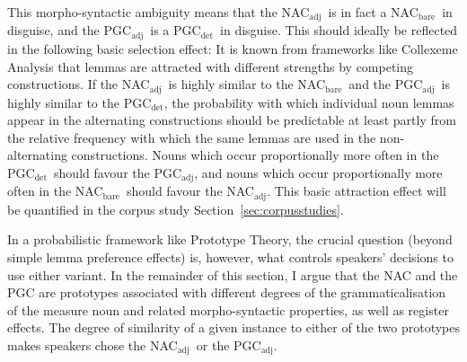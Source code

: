 \documentclass[USenglish]{article}
\newcommand{\Sub}[1]{\ensuremath{\mathrm{_{#1}}}}
\newcommand{\NACb}{NAC\Sub{bare}}
\newcommand{\NACa}{NAC\Sub{adj}}
\newcommand{\PGCd}{PGC\Sub{det}}
\newcommand{\PGCa}{PGC\Sub{adj}}
\begin{document}
This morpho-syntactic ambiguity means that the \NACa\ is in fact a \NACb\ in disguise, and the \PGCa\ is a \PGCd\ in disguise.
This should ideally be reflected in the following basic selection effect:
It is known from frameworks like Collexeme Analysis \citep{GriesStefanowitsch2004} that lemmas are attracted with different strengths by competing constructions.
If the \NACa\ is highly similar to the \NACb\ and the \PGCa\ is highly similar to the \PGCd, the probability with which individual noun lemmas appear in the alternating constructions should be predictable at least partly from the relative frequency with which the same lemmas are used in the non-alternating constructions.
Nouns which occur proportionally more often in the \PGCd\ should favour the \PGCa, and nouns which occur proportionally more often in the \NACb\ should favour the \NACa.
This basic attraction effect will be quantified in the corpus study Section~\ref{sec:corpusstudies}.


In a probabilistic framework like Prototype Theory, the crucial question (beyond simple lemma preference effects) is, however, what controls speakers' decisions to use either variant. 
In the remainder of this section, I argue that the NAC and the PGC are prototypes associated with different degrees of the grammaticalisation of the measure noun and related morpho-syntactic properties, as well as register effects.
The degree of similarity of a given instance to either of the two prototypes makes speakers chose the \NACa\ or the \PGCa.
\end{document}

